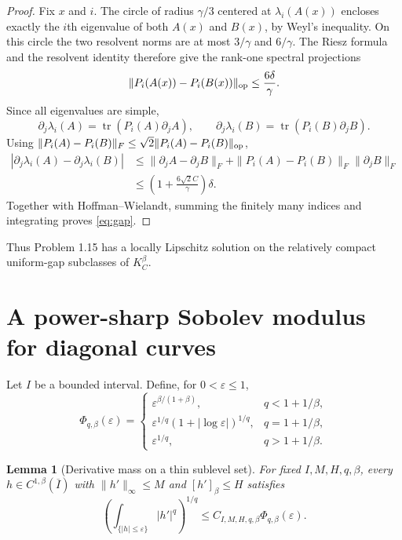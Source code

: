 \documentclass[10pt]{article}
\newtheorem{lemma}[theorem]{Lemma}
\newcommand{\tr}{\operatorname{tr}}
\begin{document}
\begin{proof}
Fix $x$ and $i$.  The circle of radius $\gamma/3$ centered at
$\lambda_i(A(x))$ encloses exactly the $i$th eigenvalue of both $A(x)$ and
$B(x)$, by Weyl's inequality.  On this circle the two resolvent norms are at
most $3/\gamma$ and $6/\gamma$.  The Riesz formula and the resolvent identity
therefore give the rank-one spectral projections
\begin{equation}\label{eq:proj}
 \|P_i(A(x))-P_i(B(x))\|_{\rm op}\leq\frac{6\delta}{\gamma}.
\end{equation}
Since all eigenvalues are simple,
\[
 \partial_j\lambda_i(A)=\tr(P_i(A)\partial_jA),
 \qquad \partial_j\lambda_i(B)=\tr(P_i(B)\partial_jB).
\]
Using $\|P_i(A)-P_i(B)\|_F\leq\sqrt2\|P_i(A)-P_i(B)\|_{\rm op}$,
\begin{align*}
 |\partial_j\lambda_i(A)-\partial_j\lambda_i(B)|
 &\leq\|\partial_jA-\partial_jB\|_F
   +\|P_i(A)-P_i(B)\|_F\|\partial_jB\|_F\\
 &\leq\left(1+\frac{6\sqrt2 C}{\gamma}\right)\delta.
\end{align*}
Together with Hoffman--Wielandt, summing the finitely many indices and
integrating proves \eqref{eq:gap}.
\end{proof}

Thus Problem 1.15 has a locally Lipschitz solution on the relatively compact
uniform-gap subclasses of $K_C^\beta$.

\section{A power-sharp Sobolev modulus for diagonal curves}

Let $I$ be a bounded interval.  Define, for $0<\varepsilon\leq1$,
\begin{equation}\label{eq:Phi}
 \Phi_{q,\beta}(\varepsilon)=
 \begin{cases}
 \varepsilon^{\beta/(1+\beta)},&q<1+1/\beta,\\
 \varepsilon^{1/q}(1+|\log\varepsilon|)^{1/q},&q=1+1/\beta,\\
 \varepsilon^{1/q},&q>1+1/\beta.
 \end{cases}
\end{equation}

\begin{lemma}[Derivative mass on a thin sublevel set]\label{lem:sublevel}
For fixed $I,M,H,q,\beta$, every $h\in C^{1,\beta}(\overline I)$ with
$\|h'\|_\infty\leq M$ and $[h']_\beta\leq H$ satisfies
\begin{equation}\label{eq:sublevel}
 \left(\int_{\{|h|\leq\varepsilon\}}|h'|^q\right)^{1/q}
 \leq C_{I,M,H,q,\beta}\Phi_{q,\beta}(\varepsilon).
\end{equation}
\end{lemma}
\end{document}
